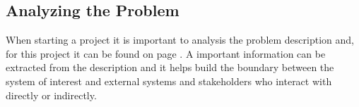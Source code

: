 \subsection{Analyzing the Problem}
When starting a project it is important to analysis the problem description and, for this project it can be found on page \pageref{sc:problemdescription}. A important information can be extracted from the description and it helps build the boundary between the system of interest and external systems and stakeholders who interact with directly or indirectly. 